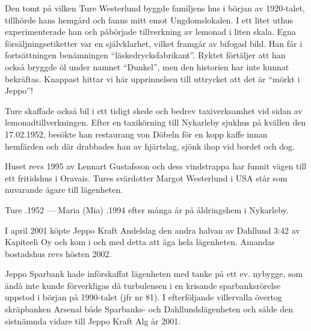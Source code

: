 Den tomt på vilken Ture Westerlund byggde familjens hus i början av 1920-talet, tillhörde hans hemgård och fanns mitt emot Ungdomslokalen. I ett litet uthus experimenterade han och påbörjade tillverkning av lemonad i liten skala. Egna försäljningsetiketter var en självklarhet, vilket framgår av bifogad bild. Han får i fortsättningen benämningen ``läskedrycksfabrikant''. Ryktet förtäljer att han också bryggde öl under namnet ``Dunkel'', men den historien har inte kunnat bekräftas. Knappast hittar vi här upprinnelsen till uttrycket att det är ``mörkt i Jeppo''!

Ture skaffade också bil i ett tidigt skede och bedrev taxiverksamhet vid sidan av lemonadtillverkningen. Efter en taxikörning till Nykarleby sjukhus på kvällen den 17.02.1952, besökte han restaurang von Döbeln för en kopp kaffe innan hemfärden och där drabbades han av hjärtslag, sjönk ihop vid bordet och dog.

Huset revs 1995 av Lennart Gustafsson och dess vindstrappa har funnit vägen till ett fritidshus i Oravais. Tures svärdotter Margot Westerlund i USA står som nuvarande ägare till lägenheten.

Ture .1952 --- Maria (Mia) .1994 efter många år på åldringshem i Nykarleby.



%



%
I april 2001 köpte Jeppo Kraft Andelslag den andra halvan av Dahllund 3:42 av Kapiteeli Oy och kom i och med detta att äga hela lägenheten. Amandas bostadshus revs hösten 2002.


%
Jeppo Sparbank hade införskaffat lägenheten med tanke på ett ev. nybygge, som ändå inte kunde förverkligas då turbulensen i en krisande sparbanksrörelse uppstod i början på 1990-talet (jfr nr 81). I efterföljande villervalla övertog skräpbanken Arsenal både Sparbanks- och Dahllundslägenheten och sålde den sistnämnda vidare till Jeppo Kraft Alg år 2001.


%
\jhvspace{}


